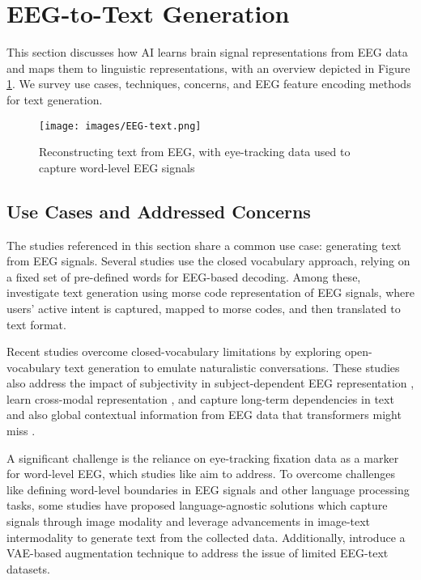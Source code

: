 \section{EEG-to-Text Generation}

This section discusses how AI learns brain signal representations from EEG data and maps them to linguistic representations, with an overview depicted in Figure \ref{fig:EEG-text}. We survey use cases, techniques, concerns, and EEG feature encoding methods for text generation.

\begin{figure}[t]
     \centering
    {\texttt{[image: images/EEG-text.png]}}
   \caption{Reconstructing text from EEG, with eye-tracking data used to capture word-level EEG signals}
	\label{fig:EEG-text}
\end{figure}

\subsection{Use Cases and Addressed Concerns}

The studies referenced in this section share a common use case: generating text from EEG signals. Several studies \cite{biswal2019eegtotext,srivastava2020think2type,yang2023thoughts,rathod2024folded} use the closed vocabulary approach, relying on a fixed set of pre-defined words for EEG-based decoding. Among these, \citet{srivastava2020think2type,yang2023thoughts} investigate text generation using morse code representation of EEG signals, where users' active intent is captured, mapped to morse codes, and then translated to text format.

Recent studies \cite{wang2022open,feng2023aligning,duan2023dewave,liu2024eeg2text,wang2024enhancing,amrani2024deep,tao2024see,mishra2024thought2text,ikegawa2024text,chen2025decoding} overcome closed-vocabulary limitations by exploring open-vocabulary text generation to emulate naturalistic conversations. These studies also address the impact of subjectivity in subject-dependent EEG representation \cite{feng2023aligning,amrani2024deep}, learn cross-modal representation \cite{wang2024enhancing,tao2024see}, and capture long-term dependencies in text and also global contextual information from EEG data that transformers might miss \cite{rathod2024folded,chen2025decoding}.

A significant challenge is the reliance on eye-tracking fixation data as a marker for word-level EEG, which studies like \cite{duan2023dewave,liu2024eeg2text} aim to address. To overcome challenges like defining word-level boundaries in EEG signals and other language processing tasks, some studies have proposed language-agnostic solutions \cite{mishra2024thought2text, ikegawa2024text} which capture signals through image modality and leverage advancements in image-text intermodality to generate text from the collected data. Additionally, \citet{yu2025decoding} introduce a VAE-based augmentation technique to address the issue of limited EEG-text datasets.  

